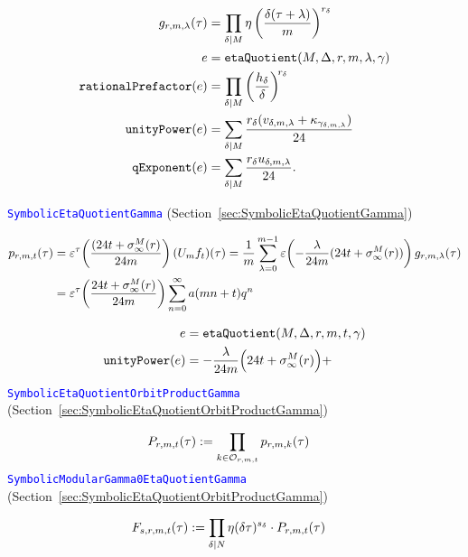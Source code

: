 \documentclass{article}
\begin{document}
\begin{Hemmecke}
\begin{align*}
  g_{r,m,\lambda}(\tau)
  &=
    \divisorprod{M}
    \eta\left(\frac{\delta(\tau+\lambda)}{m}\right)^{r_\delta}
  \\
  e &= \mathtt{etaQuotient}(M, \Delta, r, m, \lambda , \gamma)
  \\
  \mathtt{rationalPrefactor}(e)
  &=
    \divisorprod{M} \left(\frac{h_\delta}{\delta}\right)^{\!r_\delta}
  \\
  \mathtt{unityPower}(e)
  &=
    \divisorsum{M} \frac{r_\delta(v_{\delta,m,\lambda} +
                         \kappa_{\gamma_{\delta,m,\lambda}})}{24}
  \\
  \mathtt{qExponent}(e)
  &=
    \divisorsum{M} \frac{r_\delta u_{\delta,m,\lambda}}{24}.
\end{align*}

\textcolor{blue}{\texttt{SymbolicEtaQuotientGamma}}
(Section~\ref{sec:SymbolicEtaQuotientGamma})

\begin{align*}
  p_{r,m,t}(\tau)
  &=
    \unityPowerTau{\frac{(24t+\sigmainfty[M]{r}}{24m} } (U_mf_t)(\tau)
    =
    \frac{1}{m} \sum_{\lambda=0}^{m-1}
    \unityPower{-\frac{\lambda}{24m} (24t+\sigmainfty[M]{r})}
    g_{r,m,\lambda}(\tau)
  \\
  &=
    \unityPowerTau{\frac{24t+\sigmainfty[M]{r}}{24m}}
    \sum_{n=0}^\infty a(mn+t) q^n
\end{align*}



\begin{align*}
  e &= \mathtt{etaQuotient}(M, \Delta, r, m, t, \gamma)
  \\
  \mathtt{unityPower}(e)
  &=
    -\frac{\lambda}{24m}\Bigl(24t+\sigmainfty[M]{r}\Bigr) +
\end{align*}



\textcolor{blue}{\texttt{SymbolicEtaQuotientOrbitProductGamma}}
(Section~\ref{sec:SymbolicEtaQuotientOrbitProductGamma})

\begin{align*}
  P_{r, m, t}(\tau)
  &:=
    \prod_{k \in \modularOrbit{r,m,t}}
    p_{r,m,k}(\tau)
\end{align*}
\textcolor{blue}{\texttt{SymbolicModularGamma0EtaQuotientGamma}}
(Section~\ref{sec:SymbolicEtaQuotientOrbitProductGamma})

\begin{align*}
  F_{s, r, m, t}(\tau)
  &:=
    \divisorprod{N} \eta(\delta \tau)^{s_\delta} \cdot P_{r, m, t}(\tau)
\end{align*}







\end{Hemmecke}
\end{document}
